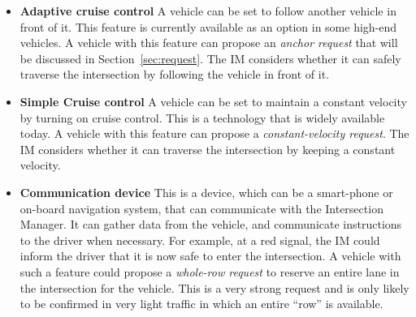 \begin{itemize}

\item \textbf{Adaptive cruise control} A vehicle can be set to follow
another vehicle in front of it.  This feature is currently available
as an option in some high-end vehicles. A vehicle with this feature
can propose an \textit{anchor request} that will be discussed in
Section~\ref{sec:request}.  The IM considers whether it can safely
traverse the intersection by following the vehicle in front of it.

\item \textbf{Simple Cruise control} A vehicle can be set to maintain
a constant velocity by turning on cruise control. This is a technology
that is widely available today. A vehicle with this feature can
propose a \textit{constant-velocity request}. The IM considers whether
it can traverse the intersection by keeping a constant velocity.

\item \textbf{Communication device} This is a device, which can be a
smart-phone or on-board navigation system, that can communicate with
the Intersection Manager.  It can gather data from the vehicle, and
communicate instructions to the driver when necessary.  For example,
at a red signal, the IM could inform the driver that it is now safe to
enter the intersection.  A vehicle with such a feature could propose a
\textit{whole-row request} to reserve an entire lane in the
intersection for the vehicle.  This is a very strong request and is
only likely to be confirmed in very light traffic in which an entire
``row'' is available.



\end{itemize}

